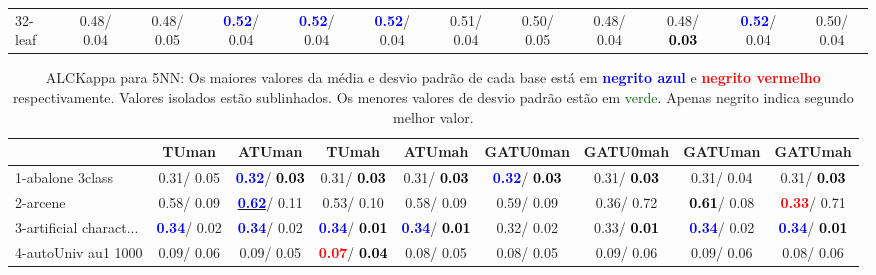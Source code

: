 \begin{table}[h]
\begin{center}
{\begin{tabular}{lc|c|c|c|c|c|c|c|c|c|c}
32-leaf &   0.48/  0.04 &   0.48/  0.05 & \textcolor{blue}{\textbf{  0.52}}/  0.04 & \textcolor{blue}{\textbf{  0.52}}/  0.04 & \textcolor{blue}{\textbf{  0.52}}/  0.04 &   0.51/  0.04 &   0.50/  0.05 &   0.48/  0.04 &   0.48/\textcolor{black}{\textbf{  0.03}} & \textcolor{blue}{\textbf{  0.52}}/  0.04 &   0.50/  0.04 \\\end{tabular}}\label{stratsALCKappa0a5NN}
\end{center}
\end{table}
\begin{table}[h]
\caption{ALCKappa para 5NN: Os maiores valores da média e desvio padrão de cada base está em \textcolor{blue}{\textbf{negrito azul}} e \textcolor{red}{\textbf{negrito vermelho}} respectivamente. Valores isolados estão sublinhados. Os menores valores de desvio padrão estão em \textcolor{darkgreen}{verde}. Apenas negrito indica segundo melhor valor.}
\begin{center}\begin{tabular}{lc|c|c|c|c|c|c|c}
 & TUman & \textbf{ATUman} & TUmah & \textbf{ATUmah} & GATU0man & GATU0mah & GATUman & GATUmah\\ \hline 1-abalone 3class &   0.31/  0.05 & \textcolor{blue}{\textbf{  0.32}}/\textcolor{black}{\textbf{  0.03}} &   0.31/\textcolor{black}{\textbf{  0.03}} &   0.31/\textcolor{black}{\textbf{  0.03}} & \textcolor{blue}{\textbf{  0.32}}/\textcolor{black}{\textbf{  0.03}} &   0.31/\textcolor{black}{\textbf{  0.03}} &   0.31/  0.04 &   0.31/\textcolor{black}{\textbf{  0.03}} \\
2-arcene &   0.58/  0.09 & \underline{\textcolor{blue}{\textbf{  0.62}}}/  0.11 &   0.53/  0.10 &   0.58/  0.09 &   0.59/  0.09 &   0.36/  0.72 & \textcolor{black}{\textbf{  0.61}}/  0.08 & \textcolor{red}{\textbf{  0.33}}/  0.71 \\
3-artificial charact... & \textcolor{blue}{\textbf{  0.34}}/  0.02 & \textcolor{blue}{\textbf{  0.34}}/  0.02 & \textcolor{blue}{\textbf{  0.34}}/\textcolor{black}{\textbf{  0.01}} & \textcolor{blue}{\textbf{  0.34}}/\textcolor{black}{\textbf{  0.01}} &   0.32/  0.02 &   0.33/\textcolor{black}{\textbf{  0.01}} & \textcolor{blue}{\textbf{  0.34}}/  0.02 & \textcolor{blue}{\textbf{  0.34}}/\textcolor{black}{\textbf{  0.01}} \\
4-autoUniv au1 1000 &   0.09/  0.06 &   0.09/  0.05 & \textcolor{red}{\textbf{  0.07}}/\textcolor{black}{\textbf{  0.04}} &   0.08/  0.05 &   0.08/  0.05 &   0.09/  0.06 &   0.09/  0.06 &   0.08/  0.06 \\

\end{tabular}
\end{center}
\end{table}
